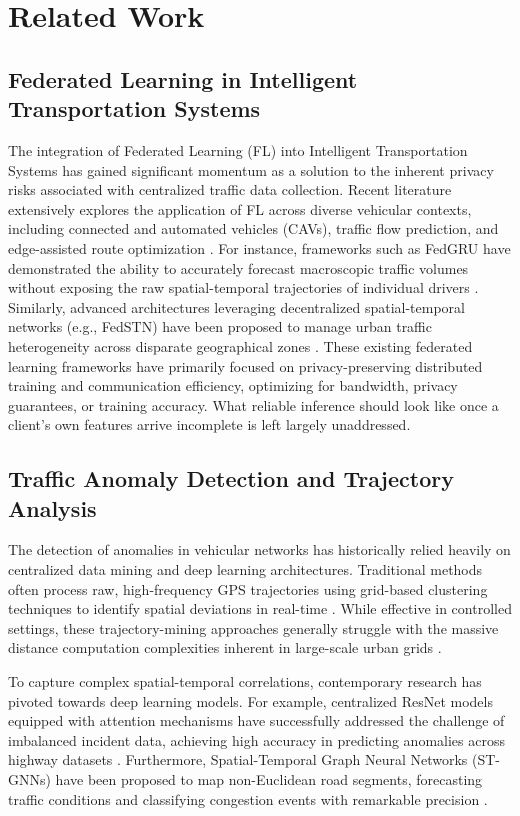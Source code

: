 \section{Related Work}

\subsection{Federated Learning in Intelligent Transportation Systems}

The integration of Federated Learning (FL) into Intelligent Transportation Systems has gained significant momentum as a solution to the inherent privacy risks associated with centralized traffic data collection. Recent literature extensively explores the application of FL across diverse vehicular contexts, including connected and automated vehicles (CAVs), traffic flow prediction, and edge-assisted route optimization \cite{Sanadi_2026}. For instance, frameworks such as FedGRU have demonstrated the ability to accurately forecast macroscopic traffic volumes without exposing the raw spatial-temporal trajectories of individual drivers \cite{Liu_2020}. Similarly, advanced architectures leveraging decentralized spatial-temporal networks (e.g., FedSTN) have been proposed to manage urban traffic heterogeneity across disparate geographical zones \cite{Yuan_2024, Zhang_2025}. These existing federated learning frameworks have primarily focused on privacy-preserving distributed training and communication efficiency, optimizing for bandwidth, privacy guarantees, or training accuracy. What reliable inference should look like once a client's own features arrive incomplete is left largely unaddressed.

\subsection{Traffic Anomaly Detection and Trajectory Analysis}

The detection of anomalies in vehicular networks has historically relied heavily on centralized data mining and deep learning architectures. Traditional methods often process raw, high-frequency GPS trajectories using grid-based clustering techniques to identify spatial deviations in real-time \cite{Raiyn_2014}. While effective in controlled settings, these trajectory-mining approaches generally struggle with the massive distance computation complexities inherent in large-scale urban grids \cite{Su_2019}. 

To capture complex spatial-temporal correlations, contemporary research has pivoted towards deep learning models. For example, centralized ResNet models equipped with attention mechanisms have successfully addressed the challenge of imbalanced incident data, achieving high accuracy in predicting anomalies across highway datasets \cite{El_Manaa_2022}. Furthermore, Spatial-Temporal Graph Neural Networks (ST-GNNs) have been proposed to map non-Euclidean road segments, forecasting traffic conditions and classifying congestion events with remarkable precision \cite{Gao_2023}. 

